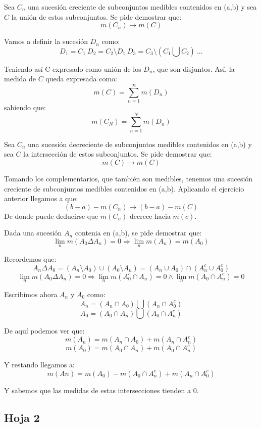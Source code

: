 \begin{problem}[11]
Sea $C_n$ una sucesión creciente de subconjuntos medibles contenidos en (a,b) y sea $C$ la unión de estos subconjuntos. Se pide demostrar que:
\[m(C_n) \rightarrow m(C)\]

\solution
Vamos a definir la sucesión $D_n$ como:
\[D_1=C_1 \ D_2 = C_2 \setminus D_1 \ D_3 = C_3 \setminus (C_1 \bigcup C_2) \ ...\]

Teniendo así C expresado como unión de los $D_n$, que son disjuntos. Así, la medida de $C$ queda expresada como:
\[m(C)=\sum_{n=1}^{\infty}m(D_n)\]
sabiendo que:
\[m(C_N)=\sum_{n=1}^{N}m(D_n)\]
\end{problem}

\begin{problem}[12]
Sea $C_n$ una sucesión decreciente de subconjuntos medibles contenidos en (a,b) y sea $C$ la intersección de estos subconjuntos. Se pide demostrar que:
\[m(C) \rightarrow m(C)\]
\solution

Tomando los complementarios, que también son medibles, tenemos una sucesión creciente de subconjuntos medibles contenidos en (a,b). Aplicando el ejercicio anterior llegamos a que:
\[(b-a)-m(C_n) \rightarrow (b-a)-m(C)\]
De donde puede deducirse que $m(C_n)$ decrece hacia $m(c)$.
\end{problem}

\begin{problem}[14]
Dada una sucesión $A_n$ contenia en (a,b), se pide demostrar que:
\[\lim_n m(A_0\Delta A_n)=0 \Rightarrow \lim_n m(A_n)=m(A_0) \]

Recordemos que:
\[ A_n \Delta A_0 = (A_n \setminus A_0) \cup (A_0 \setminus A_n) =
(A_n \cup A_0)\cap(A_n^c \cup A_0^c) \]
\solution
\[\lim_n m(A_0\Delta A_n)=0 \Rightarrow \lim_n m(A_0^c \cap A_n)=0 \wedge \lim_n m(A_0\cap A_n^c)=0\]

Escribimos ahora $A_n$ y $A_0$ como:
\[A_n = (A_n \cap A_0) \bigcup (A_n \cap A_0^c)\]
\[A_0 = (A_0 \cap A_n) \bigcup (A_0 \cap A_n^c)\]

De aquí podemos ver que:
\[m(A_n) = m(A_n \cap A_0) + m(A_n \cap A_n^c)\]
\[m(A_0) = m(A_0 \cap A_n) + m(A_0 \cap A_n^c)\]

Y restando llegamos a:
\[m(An) = m(A_0) -m(A_0 \cap A_n^c) + m(A_n \cap A_0^c)\]

Y sabemos que las medidas de estas intersecciones tienden a 0.
\end{problem}

\subsection{Hoja 2}

